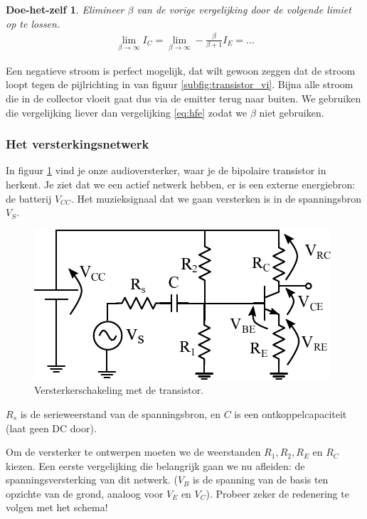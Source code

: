 \documentclass{article}
\newtheorem{DIY}{Doe-het-zelf}
\begin{document}
				\begin{DIY}
					Elimineer $\beta$ van de vorige vergelijking door de volgende limiet op te lossen.
					\begin{align*}
					    \lim_{\beta \rightarrow \infty} I_C = \lim_{\beta \rightarrow \infty} -\frac{\beta}{\beta+1}I_E = \ldots
					\end{align*}
				\end{DIY}

				Een negatieve stroom is perfect mogelijk, dat wilt gewoon zeggen dat de stroom loopt tegen de pijlrichting in van figuur \ref{subfig:transistor_vi}. Bijna alle stroom die in de collector vloeit gaat dus via de emitter terug naar buiten. We gebruiken die vergelijking liever dan vergelijking \ref{eq:hfe} zodat we $\beta$ niet gebruiken.

			\subsubsection{Het versterkingsnetwerk}
				In figuur \ref{fig:ges} vind je onze audioversterker, waar je de bipolaire transistor in herkent. Je ziet dat we een actief netwerk hebben, er is een externe energiebron: de batterij $V_{CC}$. Het muzieksignaal dat we gaan versterken is in de spanningsbron $V_S$.

				\begin{figure}[htbp]
					\centering
					\includegraphics{ges}
					\caption{Versterkerschakeling met de transistor.}
					\label{fig:ges}
				\end{figure}

				$R_s$ is de serieweerstand van de spanningsbron, en $C$ is een ontkoppelcapaciteit (laat geen DC door).

				Om de versterker te ontwerpen moeten we de weerstanden $R_1,R_2,R_E$ en $R_C$ kiezen. Een eerste vergelijking die belangrijk gaan we nu afleiden: de spanningsversterking van dit netwerk. ($V_B$ is de spanning van de basis ten opzichte van de grond, analoog voor $V_E$ en $V_C$). Probeer zeker de redenering te volgen met het schema! 
\end{document}
